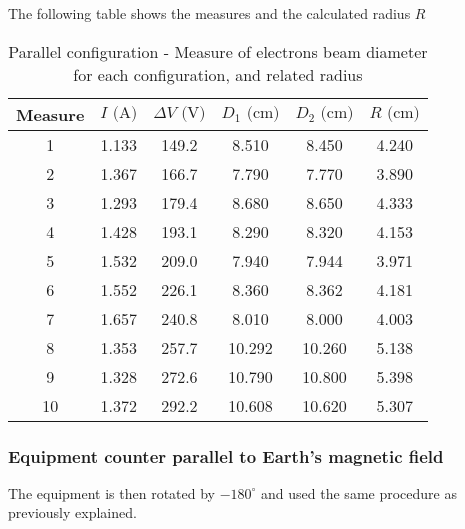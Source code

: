 The following table shows the measures and the calculated radius $R$
\begin{table}[!htbp]
    {\par\centering
    \begin{tabular}{cccccc}
        \hline
        Measure & $I \text{ (A)}$ & $\Delta V \text{ (V)}$ & $D_1 \text{ (cm)}$ & $D_2 \text{ (cm)}$ & $R \text{ (cm)}$\\
        \hline
        1   &   1.133&   149.2&   8.510&   8.450& 4.240\\
        2   &   1.367&   166.7&   7.790&   7.770& 3.890\\
        3   &   1.293&   179.4&   8.680&   8.650& 4.333\\
        4   &   1.428&   193.1&   8.290&   8.320& 4.153\\
        5   &   1.532&   209.0&   7.940&   7.944& 3.971\\
        6   &   1.552&   226.1&   8.360&   8.362& 4.181\\
        7   &   1.657&   240.8&   8.010&   8.000& 4.003\\
        8   &   1.353&   257.7&  10.292&  10.260& 5.138\\
        9   &   1.328&   272.6&  10.790&  10.800& 5.398\\
        10  &   1.372&   292.2&  10.608&  10.620& 5.307\\
        \hline
    \end{tabular}
    \par}
    \caption{Parallel configuration - Measure of electrons beam diameter for each configuration, and related radius}
\end{table}


\subsubsection{Equipment counter parallel to Earth's magnetic field}
The equipment is then rotated by $-180^{\circ}$ and used the same procedure as previously explained.

